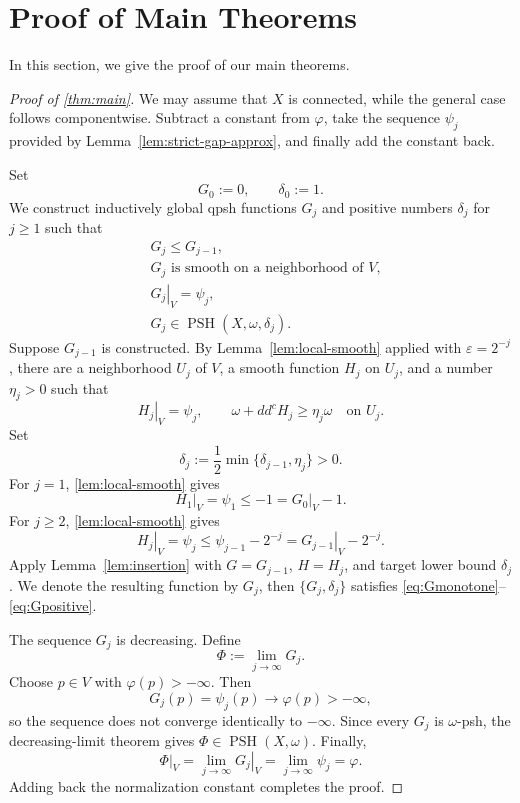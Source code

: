 \documentclass[12pt,reqno]{amsart}
\newcommand{\PSH}{\operatorname{PSH}}
\newcommand{\ddc}{dd^c}
\newcommand{\restr}[2]{\left.#1\right|_{#2}}
\begin{document}
	
	
	\section{Proof of Main Theorems}
	
	In this section, we give the proof of our main theorems.
	\begin{proof}[Proof of \cref{thm:main}]
		
		
		We may assume that $X$ is connected, while the general case follows componentwise. Subtract a constant from $\varphi$, take the sequence $\psi_j$ provided by Lemma~\ref{lem:strict-gap-approx}, and finally add the constant back.
		
		Set
		\[
		G_0:=0,
		\qquad
		\delta_0:=1.
		\]
		We construct inductively global qpsh functions $G_j$ and positive numbers $\delta_j$ for $j\geq1$ such that
		\begin{align}
			&G_j\leq G_{j-1},\label{eq:Gmonotone}\\
			&G_j\text{ is smooth on a neighborhood of }V,\label{eq:Gsmooth}\\
			&\restr{G_j}{V}=\psi_j,\label{eq:Gtrace}\\
			& G_j\in \PSH(X,\omega,\delta_j).\label{eq:Gpositive}
		\end{align}
		Suppose $G_{j-1}$ is constructed. By Lemma~\ref{lem:local-smooth} applied with $\varepsilon=2^{-j}$, there are a neighborhood $U_j$ of $V$, a smooth function $H_j$ on $U_j$, and a number $\eta_j>0$ such that
		\[
		\restr{H_j}{V}=\psi_j,
		\qquad
		\omega+\ddc H_j\geq\eta_j\omega\quad\text{on }U_j.
		\]
		Set
		\[
		\delta_j:=\frac12\min\{\delta_{j-1},\eta_j\}>0.
		\]
		For $j=1$,  \cref{lem:local-smooth} gives
		\[
		\restr{H_1}{V}=\psi_1\leq-1
		=\restr{G_0}{V}-1.
		\]
		For $j\geq2$, \cref{lem:local-smooth}  gives
		\[
		\restr{H_j}{V}=\psi_j
		\leq\psi_{j-1}-2^{-j}
		=\restr{G_{j-1}}{V}-2^{-j}.
		\]
		Apply Lemma~\ref{lem:insertion} with $G=G_{j-1}$, $H=H_j$, and target lower bound $\delta_j$.
       We denote the resulting function by $G_j$, then $\{G_j,\delta_j\}$ satisfies \eqref{eq:Gmonotone}--\eqref{eq:Gpositive}.
		
		The sequence $G_j$ is decreasing. Define
		\[
		\Phi:=\lim_{j\to\infty}G_j.
		\]
		Choose $p\in V$ with $\varphi(p)>-\infty$. Then
		\[
		G_j(p)=\psi_j(p)\longrightarrow\varphi(p)>-\infty,
		\]
		so the sequence does not converge identically to $-\infty$. Since every $G_j$ is $\omega$-psh, the decreasing-limit theorem gives $\Phi\in\PSH(X,\omega)$. Finally,
		\[
		\restr{\Phi}{V}
		=\lim_{j\to\infty}\restr{G_j}{V}
		=\lim_{j\to\infty}\psi_j
		=\varphi.
		\]
		Adding back the normalization constant completes the proof.
	\end{proof}
\end{document}

